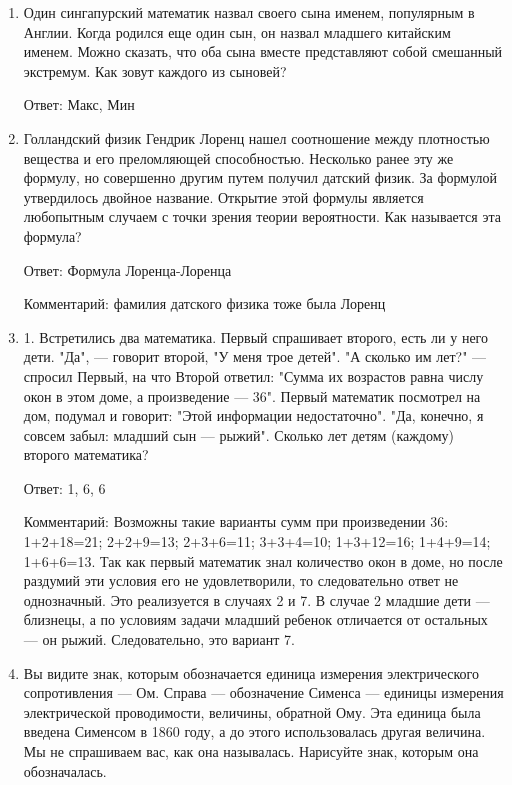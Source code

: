 \documentclass[oneside,final,14pt]{extreport}
\begin{document}
\begin{enumerate}
    Ответ: Отсутствие ветра / Прически и одежда.

    Комментарий: Если бы дирижабль или самолет висел прямо над палубой на малой высоте, винты создавали бы мощный поток воздуха, который раздувал бы одежду и волосы людей. На фото люди стояли со спокойными прическами, значит, снимок смонтирован.

    \item Один сингапурский математик назвал своего сына именем, популярным в Англии. Когда родился еще один сын, он назвал младшего китайским именем. Можно сказать, что оба сына вместе представляют собой смешанный экстремум. Как зовут каждого из сыновей?

    Ответ: Макс, Мин

    \item Голландский физик Гендрик Лоренц нашел соотношение между плотностью вещества и его преломляющей способностью. Несколько ранее эту же формулу, но совершенно другим путем получил датский физик. За формулой утвердилось двойное название. Открытие этой формулы является любопытным случаем с точки зрения теории вероятности. Как называется эта формула?

    Ответ: Формула Лоренца-Лоренца

    Комментарий: фамилия датского физика тоже была Лоренц

    \item 1. Встретились два математика. Первый спрашивает второго, есть ли у него дети. "Да", — говорит второй, "У меня трое детей". "А сколько им лет?" — спросил Первый, на что Второй ответил: "Сумма их возрастов равна числу окон в этом доме, а произведение — 36". Первый математик посмотрел на дом, подумал и говорит: "Этой информации недостаточно". "Да, конечно, я совсем забыл: младший сын — рыжий". Сколько лет детям (каждому) второго математика?

    Ответ: 1, 6, 6

    Комментарий: Возможны такие варианты сумм при произведении 36: 1+2+18=21; 2+2+9=13; 2+3+6=11; 3+3+4=10; 1+3+12=16; 1+4+9=14; 1+6+6=13. Так как первый математик знал количество окон в доме, но после раздумий эти условия его не удовлетворили, то следовательно ответ не однозначный. Это реализуется в случаях 2 и 7. В случае 2 младшие дети — близнецы, а по условиям задачи младший ребенок отличается от остальных — он рыжий. Следовательно, это вариант 7.

    \item Вы видите знак, которым обозначается единица измерения электрического сопротивления — Ом. Справа — обозначение Сименса — единицы измерения электрической проводимости, величины, обратной Ому. Эта единица была введена Сименсом в 1860 году, а до этого использовалась другая величина. Мы не спрашиваем вас, как она называлась. Нарисуйте знак, которым она обозначалась.


\end{enumerate}
\end{document}
